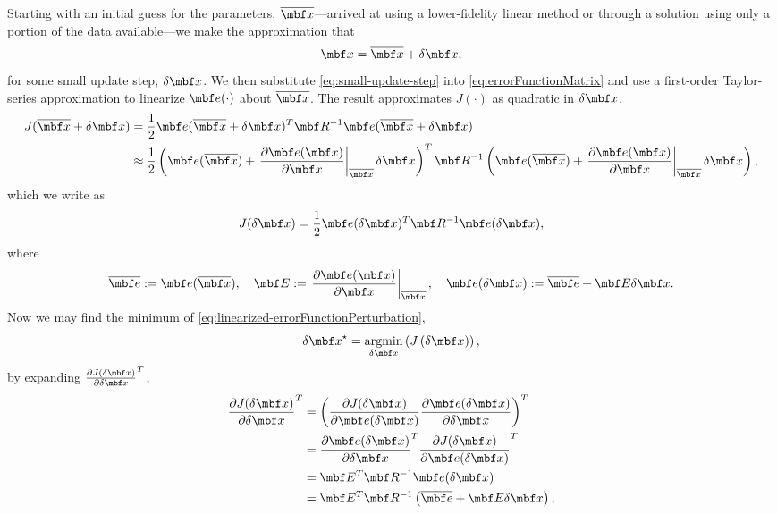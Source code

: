 \documentclass[11pt,a4,oneside]{article}
\begin{document}
Starting with an initial guess for the parameters, $\mbfbar x$---arrived at using a lower-fidelity linear method or through a solution using only a portion of the data available---we make the approximation that 
\begin{equation}
  \label{eq:small-update-step}
   \mbf x = \mbfbar x + \mbfDel x,
\end{equation}
for some small update step, $\mbfDel x$. 
We then substitute \eqref{eq:small-update-step} into \eqref{eq:errorFunctionMatrix} and use a first-order Taylor-series approximation to linearize $\mbf e(\cdot)$ about $\mbfbar x$. The result approximates $J(\cdot)$ as quadratic in $\mbfDel x$,
\begin{subequations}
\begin{flalign}
  \label{eq:linearized-errorFunctionMatrix}
  J(\mbfbar x + \mbfDel x) & =  \frac{1}{2}\mbf e(\mbfbar x + \mbfDel x)^T \mbf R^{-1} \mbf e(\mbfbar x + \mbfDel x) \\
  & \approx \frac{1}{2}\left(\mbf e(\mbfbar x) + \left.\pd{\mbf e(\mbf x)}{\mbf x}\right|_{\mbfbar x}\mbfDel x \right)^T \mbf R^{-1} \left(\mbf e(\mbfbar x) + \left.\pd{\mbf e(\mbf x)}{\mbf x}\right|_{\mbfbar x}\mbfDel x \right),
\end{flalign}
\end{subequations}
which we write as
\begin{equation}
  \label{eq:linearized-errorFunctionPerturbation}
  J(\mbfDel x) = \frac{1}{2} \mbf e(\mbfDel x)^T \mbf R^{-1} \mbf e( \mbfDel x ),
\end{equation}
where
\begin{equation}
  \label{eq:linearized-function}
\mbfbar e := \mbf e(\mbfbar x), \quad \mbf E := \left.\pd{\mbf e(\mbf x)}{\mbf x}\right|_{\mbfbar x}, \quad \mbf e(\mbfDel x) := \mbfbar e + \mbf E \mbfDel x.
\end{equation}
Now we may find the minimum of \eqref{eq:linearized-errorFunctionPerturbation},
\begin{equation}
  \label{eq:minErrorLinearized}
  \mbfDel x^\star = \underset{\mbfDel x}{\operatorname{argmin}}\left(J\left(\mbfDel x \right)\right),
\end{equation}
by expanding $\pd{J(\mbfDel x)}{\mbfDel x}^T$,
\begin{subequations}
  \begin{flalign}
    \pd{J(\mbfDel x)}{\mbfDel x}^T & = \left(\pd{J(\mbfDel x)}{\mbf e(\mbfDel x)}\pd{\mbf e(\mbfDel x)}{\mbfDel x} \right)^T\\
                                                & = \pd{\mbf e(\mbfDel x)}{\mbfDel x}^T \pd{J(\mbfDel x)}{\mbf e(\mbfDel x)}^T\\
                                                & = \mbf E^T \mbf R^{-1}\mbf e(\mbfDel x)\\
                                                & = \mbf E^T \mbf R^{-1}\left(\mbfbar e + \mbf E \mbfDel x \right),
  \end{flalign}
\end{subequations}
\end{document}
